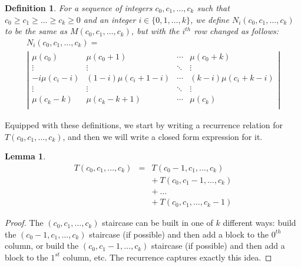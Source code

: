 \documentclass[12pt]{amsart}
\newtheorem{definition}[theorem]{Definition}
\newtheorem{lemma}[theorem]{Lemma}
\newcommand{\ifact}{\mu}
\newcommand{\M}{M}
\newcommand{\N}{N}
\begin{document}

\begin{definition}
For a sequence of integers $c_0, c_1, \dots, c_k$ such that $c_0 \geq c_1 \geq \dots \geq c_k \geq 0$ and an integer $i \in \{0,1,\dots,k\}$, we define $\N_i(c_0,c_1,\dots,c_k)$ to be the same as $\M(c_0, c_1, \dots, c_k)$, but with the $i^{th}$ row changed as follows:
\begin{multline*}
\N_i(c_0, c_1, \dots, c_k) = \\
\left|
\begin{matrix}
\ifact(c_0) & \ifact(c_0+1) & \cdots & \ifact(c_0+k) \\
\vdots & \vdots & \ddots & \vdots \\
-i\ifact(c_i-i) & (1-i)\ifact(c_i + 1 - i) & \cdots & (k-i) \ifact(c_i+k-i) \\
\vdots & \vdots & \ddots & \vdots \\
\ifact(c_k-k) & \ifact(c_k-k+1) & \cdots & \ifact(c_k) \\
\end{matrix} \right|
\end{multline*}
\end{definition}

\vspace{0.75cm}

Equipped with these definitions, we start by writing a recurrence relation for $T(c_0, c_1, \dots, c_k)$, and then we will write a closed form expression for it.


\begin{lemma}
$$\begin{array}{ccl}
T(c_0, c_1, \dots, c_k) & = & T(c_0-1, c_1, \dots, c_k) \\
& & +\ T(c_0, c_1-1, \dots, c_k) \\
& & +\ \dots \\
& & +\ T(c_0, c_1, \dots, c_k-1)
\end{array}$$
\label{lem:recurrence}
\end{lemma}

\begin{proof}
The $(c_0, c_1, \dots, c_k)$ staircase can be built in one of $k$ different ways: build the $(c_0-1, c_1, \dots, c_k)$ staircase (if possible) and then add a block to the $0^{th}$ column, or build the $(c_0, c_1-1, \dots, c_k)$ staircase (if possible) and then add a block to the $1^{st}$ column, etc. The recurrence captures exactly this idea. 
\end{proof}
\end{document}

